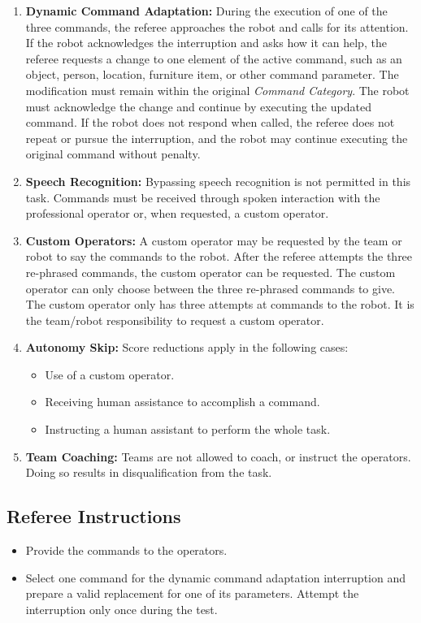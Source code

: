 \begin{enumerate}[nosep]
	\textit{Example:} The robot first picks up an object, then performs another task along the way, and only afterward delivers the object to its original destination. 
	\item \textbf{Dynamic Command Adaptation:} During the execution of one of the three commands, the referee approaches the robot and calls for its attention. If the robot acknowledges the interruption and asks how it can help, the referee requests a change to one element of the active command, such as an object, person, location, furniture item, or other command parameter. The modification must remain within the original \textit{Command Category}. The robot must acknowledge the change and continue by executing the updated command. If the robot does not respond when called, the referee does not repeat or pursue the interruption, and the robot may continue executing the original command without penalty.
	\item \textbf{Speech Recognition:} Bypassing speech recognition is not permitted in this task. Commands must be received through spoken interaction with the professional operator or, when requested, a custom operator.
	\item \textbf{Custom Operators:} A custom operator may be requested by the team or robot to say the commands to the robot. 
									After the referee attempts the three re-phrased commands, the custom operator can be requested. 
									The custom operator can only choose between the three re-phrased commands to give.
									The custom operator only has three attempts at commands to the robot.
									It is the team/robot responsibility to request a custom operator.
	\item \textbf{Autonomy Skip:} Score reductions apply in the following cases:
	\begin{itemize}
		\item Use of a custom operator.
		\item Receiving human assistance to accomplish a command.
		\item Instructing a human assistant to perform the whole task.
	\end{itemize}
	\item \textbf{Team Coaching:} Teams are not allowed to coach, or instruct the operators. Doing so results in disqualification from the task.
\end{enumerate}

\newpage
\subsection*{Referee Instructions}
\begin{itemize}[nosep]
	\item Provide the commands to the operators.
	\item Select one command for the dynamic command adaptation interruption and prepare a valid replacement for one of its parameters. Attempt the interruption only once during the test.
\end{itemize}

